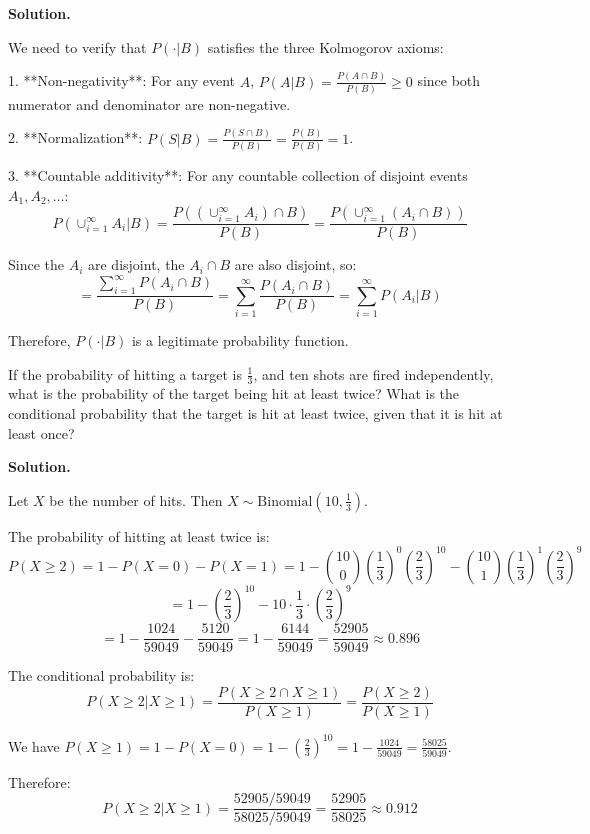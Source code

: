 \noindent\textbf{Solution.}

We need to verify that $P(\cdot|B)$ satisfies the three Kolmogorov axioms:

1. **Non-negativity**: For any event $A$, $P(A|B) = \frac{P(A \cap B)}{P(B)} \geq 0$ since both numerator and denominator are non-negative.

2. **Normalization**: $P(S|B) = \frac{P(S \cap B)}{P(B)} = \frac{P(B)}{P(B)} = 1$.

3. **Countable additivity**: For any countable collection of disjoint events $A_1, A_2, \ldots$:
   \[ P(\cup_{i=1}^{\infty} A_i|B) = \frac{P((\cup_{i=1}^{\infty} A_i) \cap B)}{P(B)} = \frac{P(\cup_{i=1}^{\infty} (A_i \cap B))}{P(B)} \]
   
   Since the $A_i$ are disjoint, the $A_i \cap B$ are also disjoint, so:
   \[ = \frac{\sum_{i=1}^{\infty} P(A_i \cap B)}{P(B)} = \sum_{i=1}^{\infty} \frac{P(A_i \cap B)}{P(B)} = \sum_{i=1}^{\infty} P(A_i|B) \]

Therefore, $P(\cdot|B)$ is a legitimate probability function.


\begin{problembox}
If the probability of hitting a target is $\frac{1}{3}$, and ten shots are fired independently, what is the probability of the target being hit at least twice? What is the conditional probability that the target is hit at least twice, given that it is hit at least once?
\end{problembox}

\noindent\textbf{Solution.}

Let $X$ be the number of hits. Then $X \sim \text{Binomial}(10, \frac{1}{3})$.

The probability of hitting at least twice is:
\[ P(X \geq 2) = 1 - P(X = 0) - P(X = 1) = 1 - \binom{10}{0}\left(\frac{1}{3}\right)^0\left(\frac{2}{3}\right)^{10} - \binom{10}{1}\left(\frac{1}{3}\right)^1\left(\frac{2}{3}\right)^9 \]
\[ = 1 - \left(\frac{2}{3}\right)^{10} - 10 \cdot \frac{1}{3} \cdot \left(\frac{2}{3}\right)^9 \]
\[ = 1 - \frac{1024}{59049} - \frac{5120}{59049} = 1 - \frac{6144}{59049} = \frac{52905}{59049} \approx 0.896 \]

The conditional probability is:
\[ P(X \geq 2|X \geq 1) = \frac{P(X \geq 2 \cap X \geq 1)}{P(X \geq 1)} = \frac{P(X \geq 2)}{P(X \geq 1)} \]

We have $P(X \geq 1) = 1 - P(X = 0) = 1 - \left(\frac{2}{3}\right)^{10} = 1 - \frac{1024}{59049} = \frac{58025}{59049}$.

Therefore:
\[ P(X \geq 2|X \geq 1) = \frac{52905/59049}{58025/59049} = \frac{52905}{58025} \approx 0.912 \]


